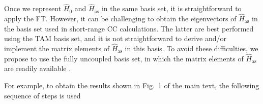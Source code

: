 \documentclass[reprint,amssymb,noeprint,twocolumn,longbibliography]{revtex4-2}
\begin{document}


{
Once we represent $\hat{H}_0$ and  $\hat{H}_\text{as}$  in the same basis set, it is straightforward to apply the FT. However, it can be challenging to obtain the eigenvectors of $\hat{H}_\text{as}$ in the basis set used in short-range CC calculations. The latter are best performed using the TAM basis set, and it is not straightforward to derive and/or implement the matrix elements of $\hat{H}_\text{as}$ in this basis. 
To avoid these difficulties, %
we propose to use the fully uncoupled basis set, in which the matrix elements of $\hat{H}_\text{as}$ are readily available \cite{Krems_04}. 
}


For example, to obtain the results  shown in Fig.~1 of  the main text, the following sequence of steps is used
\end{document}
